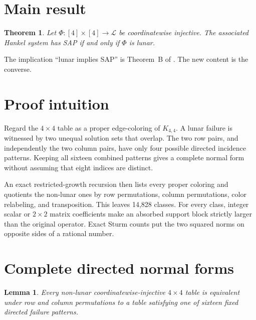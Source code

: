 \documentclass[11pt]{article}
\newtheorem{theorem}{Theorem}
\newtheorem{lemma}{Lemma}
\begin{document}
\section{Main result}

\begin{theorem}\label{thm:main}
Let $\Phi:[4]\times[4]\to\mathcal L$ be coordinatewise injective.  The
associated Hankel system has SAP if and only if $\Phi$ is lunar.
\end{theorem}

The implication ``lunar implies SAP'' is Theorem~B of
\cite{HanQiuWang2024}.  The new content is the converse.

\section{Proof intuition}

Regard the $4\times4$ table as a proper edge-coloring of $K_{4,4}$.  A lunar
failure is witnessed by two unequal solution sets that overlap.  The two row
pairs, and independently the two column pairs, have only four possible
directed incidence patterns.  Keeping all sixteen combined patterns gives a
complete normal form without assuming that eight indices are distinct.

An exact restricted-growth recursion then lists every proper coloring and
quotients the non-lunar ones by row permutations, column permutations, color
relabeling, and transposition.  This leaves 14,828 classes.  For every class,
integer scalar or $2\times2$ matrix coefficients make an absorbed support
block strictly larger than the original operator.  Exact Sturm counts put the
two squared norms on opposite sides of a rational number.

\section{Complete directed normal forms}

\begin{lemma}\label{lem:normal}
Every non-lunar coordinatewise-injective $4\times4$ table is equivalent under
row and column permutations to a table satisfying one of sixteen fixed
directed failure patterns.
\end{lemma}
\end{document}
